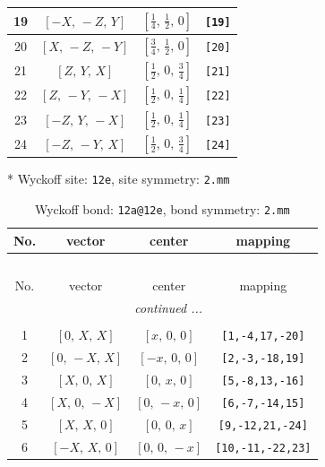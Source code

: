 \documentclass[fleqn,8pt]{jsarticle}
\begin{document}
\begin{longtable}{cccc}
19 & $\left[ - X,\, - Z,\, Y \right]$ & $\left[ \frac{1}{4},\, \frac{1}{2},\, 0 \right]$ & {\tt [19]} \\ \hline
20 & $\left[ X,\, - Z,\, - Y \right]$ & $\left[ \frac{3}{4},\, \frac{1}{2},\, 0 \right]$ & {\tt [20]} \\ \hline
21 & $\left[ Z,\, Y,\, X \right]$ & $\left[ \frac{1}{2},\, 0,\, \frac{3}{4} \right]$ & {\tt [21]} \\ \hline
22 & $\left[ Z,\, - Y,\, - X \right]$ & $\left[ \frac{1}{2},\, 0,\, \frac{1}{4} \right]$ & {\tt [22]} \\ \hline
23 & $\left[ - Z,\, Y,\, - X \right]$ & $\left[ \frac{1}{2},\, 0,\, \frac{1}{4} \right]$ & {\tt [23]} \\ \hline
24 & $\left[ - Z,\, - Y,\, X \right]$ & $\left[ \frac{1}{2},\, 0,\, \frac{3}{4} \right]$ & {\tt [24]} \\
\end{longtable}
* Wyckoff site: {\tt 12e}, site symmetry: {\tt 2.mm}
\renewcommand{\arraystretch}{1.2}
\begin{longtable}{cccc}
\caption{Wyckoff bond: {\tt 12a@12e}, bond symmetry: {\tt 2.mm}}
 \\
 \hline \hline
No. & vector & center & mapping \\ \hline \endfirsthead

\multicolumn{3}{l}{\tablename\ \thetable{}} \\
 \hline \hline
No. & vector & center & mapping \\ \hline \endhead

 \hline \hline
\multicolumn{3}{r}{\footnotesize\it continued ...} \\ \endfoot

 \hline \hline
\multicolumn{3}{r}{} \\ \endlastfoot

1 & $\left[ 0,\, X,\, X \right]$ & $\left[ x,\, 0,\, 0 \right]$ & {\tt [1,-4,17,-20]} \\ \hline
2 & $\left[ 0,\, - X,\, X \right]$ & $\left[ - x,\, 0,\, 0 \right]$ & {\tt [2,-3,-18,19]} \\ \hline
3 & $\left[ X,\, 0,\, X \right]$ & $\left[ 0,\, x,\, 0 \right]$ & {\tt [5,-8,13,-16]} \\ \hline
4 & $\left[ X,\, 0,\, - X \right]$ & $\left[ 0,\, - x,\, 0 \right]$ & {\tt [6,-7,-14,15]} \\ \hline
5 & $\left[ X,\, X,\, 0 \right]$ & $\left[ 0,\, 0,\, x \right]$ & {\tt [9,-12,21,-24]} \\ \hline
6 & $\left[ - X,\, X,\, 0 \right]$ & $\left[ 0,\, 0,\, - x \right]$ & {\tt [10,-11,-22,23]} \\
\end{longtable}
\end{document}
